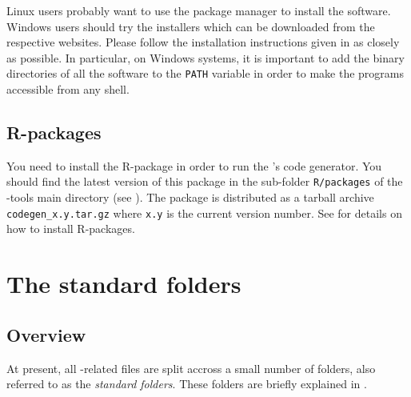 Linux users probably want to use the package manager to install the software. Windows users should try the installers which can be downloaded from the respective websites. Please follow the installation instructions given in  as closely as possible. In particular, on Windows systems, it is important to add the binary directories of all the software to the \verb!PATH! variable in order to make the programs accessible from any shell.


\subsection{R-packages}

You need to install the R-package  in order to run the 's code generator. You should find the latest version of this package in the sub-folder \verb!R/packages! of the -tools main directory (see ). The package is distributed as a tarball archive \verb!codegen_x.y.tar.gz! where \verb!x.y! is the current version number. See  for details on how to install R-packages.


\section{The  standard folders} \label{sec:install:folders}


\subsection{Overview} \label{sec:install:folders:overview}

At present, all -related files are split accross a small number of folders, also referred to as the  \emph{standard folders}. These folders are briefly explained in .

